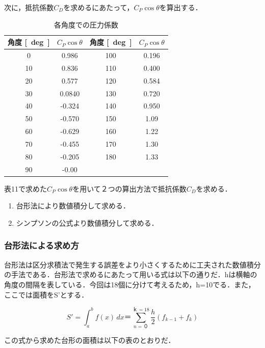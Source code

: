 \documentclass[a4paper,titlepage]{ltjsarticle}
\begin{document}
次に，抵抗係数$C_D$を求めるにあたって，$C_P\cos\theta$を算出する．

\begin{table}[hbtp]
  \caption{各角度での圧力係数}
  \centering
  \begin{tabular}{cccc}
    \toprule
    角度 {\si{[deg]}}& $C_P\cos\theta$ & 角度 {\si{[deg]}}& $C_P\cos\theta$ \\
    \hline
   0 & 0.986 & 100 & 0.196\\
   10 & 0.836& 110 & 0.400\\
   20 & 0.577& 120 & 0.584\\
   30 & 0.0840& 130 & 0.720\\
   40 & -0.324& 140 & 0.950\\
   50 & -0.570& 150 & 1.09\\
   60 & -0.629& 160 & 1.22\\
   70 & -0.455& 170 & 1.30\\
   80 & -0.205& 180 & 1.33\\
   90 & -0.00&  & \\
 \bottomrule
  \end{tabular}
\end{table}

表11で求めた$C_P\cos\theta$を用いて２つの算出方法で抵抗係数$C_D$を求める．
\begin{enumerate}
  \item 台形法により数値積分して求める．
  \item シンプソンの公式より数値積分して求める．
\end{enumerate}

\subsubsection{台形法による求め方}
 台形法は区分求積法で発生する誤差をより小さくするために工夫された数値積分の手法である．台形法で求めるにあたって用いる式は以下の通りだ．hは横軸の角度の間隔を表している．今回は18個に分けて考えるため，h=10でる．また，ここでは面積をS'とする．


 \begin{equation}
  S'=\int_{a}^{b} f(x)\,dx ＝\sum_{n = ０}^{ｋ=18}\frac{h}{2}(f_{k-1}+f_k)
 \end{equation}

 この式から求めた台形の面積は以下の表のとおりだ．
 
\end{document}
